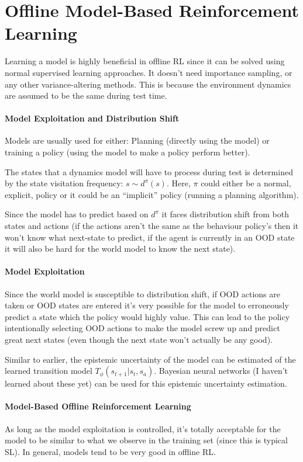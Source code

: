 \documentclass{article}
\begin{document}
\section{Offline Model-Based Reinforcement Learning}
Learning a model is highly beneficial in offline RL since it can be solved using normal supervised learning approaches. It doesn't need importance sampling, or any other variance-altering methods. This is because the environment dynamics are assumed to be the same during test time.

\paragraph{Model Exploitation and Distribution Shift}
Models are usually used for either: Planning (directly using the model) or training a policy (using the model to make a policy perform better).


The states that a dynamics model will have to process during test is determined by the state visitation frequency: \(s \sim d^{\pi}(s)\). Here, \(\pi\) could either be a normal, explicit, policy or it could be an ``implicit'' policy (running a planning algorithm).


Since the model has to predict based on \(d^{\pi}\) it faces distribution shift from both states and actions (if the actions aren't the same as the behaviour policy's then it won't know what next-state to predict, if the agent is currently in an OOD state it will also be hard for the world model to know the next state).

\paragraph{Model Exploitation} Since the world model is susceptible to distribution shift, if OOD actions are taken or OOD states are entered it's very possible for the model to erroneously predict a state which the policy would highly value. This can lead to the policy intentionally selecting OOD actions to make the model screw up and predict great next states (even though the next state won't actually be any good).


Similar to earlier, the epistemic uncertainty of the model can be estimated of the learned transition model \(T_{\phi} (s_{t+1}| s_{t},s_{a})\). Bayesian neural networks (I haven't learned about these yet) can be used for this epistemic uncertainty estimation.


\paragraph{Model-Based Offline Reinforcement Learning} As long as the model exploitation is controlled, it's totally acceptable for the model to be similar to what we observe in the training set (since this is typical SL). In general, models tend to be very good in offline RL.
\end{document}
